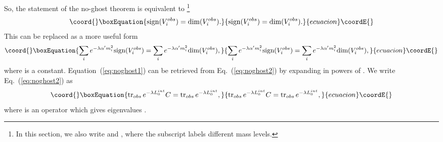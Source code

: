 \documentclass[a4paper,12pt]{article}
\providecommand{\sig}[1]{\mbox{sign}(#1)}
\providecommand{\dims}[1]{\mbox{dim}(#1)}
\providecommand{\eq}[1]{(\ref{eq:#1})}
\begin{document}
So, the statement of the no-ghost theorem is equivalent to
\footnote{In this section, we also write
\coordHE{} and \coordHE{}, where the subscript \coordHE{} labels different mass levels.}
\begin{equation}\coord{}\boxEquation{
\sig{V^{obs}_{i}} = \dims{V^{obs}_{i}}.
        \label{eq:noghost1}
}{
\sig{V^{obs}_{i}} = \dims{V^{obs}_{i}}.
        }{ecuacion}\coordE{}\end{equation}
This can be replaced as a more useful form
\begin{equation}\coord{}\boxEquation{
\sum_{i} e^{-\lambda \alpha' m_i^2} \sig{V^{obs}_{i}}
        = \sum_{i} e^{-\lambda \alpha' m_i^2} \dims{V^{obs}_{i}},
        \label{eq:noghost2}
}{
\sum_{i} e^{-\lambda \alpha' m_i^2} \sig{V^{obs}_{i}}
        = \sum_{i} e^{-\lambda \alpha' m_i^2} \dims{V^{obs}_{i}},
        }{ecuacion}\coordE{}\end{equation}
where 
\myHighlight{$\lambda$}\coordHE{} is a constant. 
Equation~\eq{noghost1} can be retrieved from Eq.~\eq{noghost2} by expanding in powers of \myHighlight{$\lambda$}\coordHE{}. 
We write Eq.~\eq{noghost2} as
\begin{equation}\coord{}\boxEquation{
\mbox{tr}_{obs} \, e^{-\lambda L_{0}^{int}} C
        = \mbox{tr}_{obs} \, e^{-\lambda L_{0}^{int}},
\label{eq:noghost3}
}{
\mbox{tr}_{obs} \, e^{-\lambda L_{0}^{int}} C
        = \mbox{tr}_{obs} \, e^{-\lambda L_{0}^{int}},
}{ecuacion}\coordE{}\end{equation}
where \coordHE{} is an operator which gives eigenvalues \coordHE{}.
\end{document}
